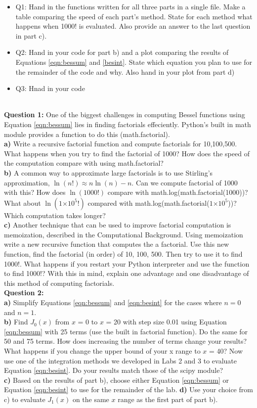 \documentclass[a4paper,12pt]{article}
\providecommand{\e}[1]{\ensuremath{\times 10^{#1}}}
\begin{document}
\begin{itemize}
\item Q1: Hand in the functions written for all three parts in a single file. Make a table comparing the speed of each part's method. State for each method what happens when 1000! is evaluated. Also provide an answer to the last question in part c).
\item Q2: Hand in your code for part b) and a plot comparing the results of Equations \ref{eqn:bessum} and \ref{besint}. State which equation you plan to use for the remainder of the code and why. Also hand in your plot from part d)
\item Q3: Hnad in your code
\end{itemize}
\\
\textbf{Question 1:} One of the biggest challenges in computing Bessel functions using Equation \ref{eqn:bessum} lies in finding factorials effeciently. Python's built in math module provides a function to do this (math.factorial).\\
\textbf{a)} Write a recursive factorial function and compute factorials for 10,100,500. What happens when you try to find the factorial of 1000? How does the speed of the computation compare with using math.factorial?\\
\textbf{b)} A common way to approximate large factorials is to use Stirling's approximation, $\ln(n!) \approx n\ln(n) - n$. Can we compute factorial of 1000 with this? How does $\ln(1000!)$ compare with math.log(math.factorial(1000))? What about $\ln(1\e{5}!)$ compared with math.log(math.factorial($1\e{5}$))? Which computation takes longer?\\
\textbf{c)} Another technique that can be used to improve factorial computation is memoization, described in the Computational Background. Using memoization write a new recursive function that computes the a factorial. Use this new function, find the factorial (in order) of 10, 100, 500. Then try to use it to find 1000!. What happens if you restart your Python interpreter and use the function to find 1000!? With this in mind, explain one advantage and one disadvantage of this method of computing factorials. \\

\textbf{Question 2:} \\
\textbf{a)} Simplify Equations \ref{eqn:bessum} and \ref{eqn:besint} for the cases where $n = 0$ and $n = 1$.\\
\textbf{b)} Find $J_0(x)$ from $x$ = 0 to $x$ = 20 with step size 0.01 using Equation \ref{eqn:bessum} with 25 terms (use the built in factorial function). Do the same for 50 and 75 terms. How does increasing the number of terms change your results? What happens if you change the upper bound of your x range to $x$ = 40? Now use one of the integration methods we developed in Labs 2 and 3 to evaluate Equation \ref{eqn:besint}. Do your results match those of the scipy module?\\
\textbf{c)} Based on the results of part b), choose either Equation \ref{eqn:bessum} or Equation \ref{eqn:besint} to use for the remainder of the lab.
\textbf{d)} Use your choice from c) to evaluate $J_1(x)$ on the same $x$ range as the first part of part b). \\
\end{document}
